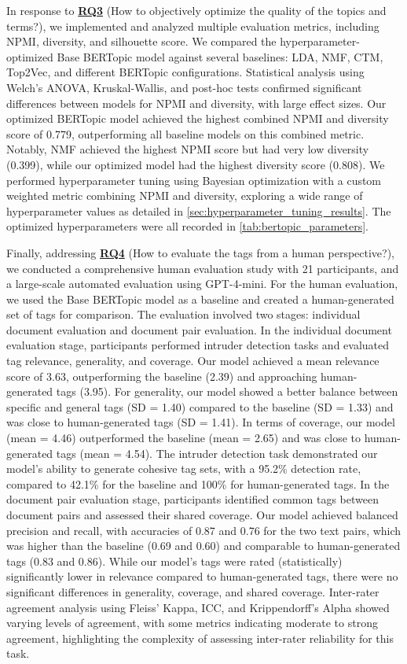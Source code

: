 In response to \hyperref[rq3]{\textbf{RQ3}} (How to objectively optimize the quality of the topics and terms?), we implemented and analyzed multiple evaluation metrics, including NPMI, diversity, and silhouette score. We compared the hyperparameter-optimized Base BERTopic model against several baselines: LDA, NMF, CTM, Top2Vec, and different BERTopic configurations. Statistical analysis using Welch’s ANOVA, Kruskal-Wallis, and post-hoc tests confirmed significant differences between models for NPMI and diversity, with large effect sizes. Our optimized BERTopic model achieved the highest combined NPMI and diversity score of 0.779, outperforming all baseline models on this combined metric. Notably, NMF achieved the highest NPMI score but had very low diversity (0.399), while our optimized model had the highest diversity score (0.808). We performed hyperparameter tuning using Bayesian optimization with a custom weighted metric combining NPMI and diversity, exploring a wide range of hyperparameter values as detailed in \cref{sec:hyperparameter_tuning_results}. The optimized hyperparameters were all recorded in \cref{tab:bertopic_parameters}.

Finally, addressing \hyperref[rq4]{\textbf{RQ4}} (How to evaluate the tags from a human perspective?), we conducted a comprehensive human evaluation study with 21 participants, and a large-scale automated evaluation using GPT-4-mini. For the human evaluation, we used the Base BERTopic model as a baseline and created a human-generated set of tags for comparison. The evaluation involved two stages: individual document evaluation and document pair evaluation. In the individual document evaluation stage, participants performed intruder detection tasks and evaluated tag relevance, generality, and coverage. Our model achieved a mean relevance score of 3.63, outperforming the baseline (2.39) and approaching human-generated tags (3.95). For generality, our model showed a better balance between specific and general tags (SD = 1.40) compared to the baseline (SD = 1.33) and was close to human-generated tags (SD = 1.41). In terms of coverage, our model (mean = 4.46) outperformed the baseline (mean = 2.65) and was close to human-generated tags (mean = 4.54). The intruder detection task demonstrated our model's ability to generate cohesive tag sets, with a 95.2\% detection rate, compared to 42.1\% for the baseline and 100\% for human-generated tags. In the document pair evaluation stage, participants identified common tags between document pairs and assessed their shared coverage. Our model achieved balanced precision and recall, with accuracies of 0.87 and 0.76 for the two text pairs, which was higher than the baseline (0.69 and 0.60) and comparable to human-generated tags (0.83 and 0.86). While our model’s tags were rated (statistically) significantly lower in relevance compared to human-generated tags, there were no significant differences in generality, coverage, and shared coverage. Inter-rater agreement analysis using Fleiss’ Kappa, ICC, and Krippendorff’s Alpha showed varying levels of agreement, with some metrics indicating moderate to strong agreement, highlighting the complexity of assessing inter-rater reliability for this task.

